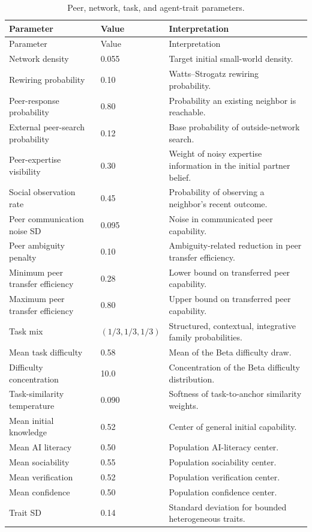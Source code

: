 \documentclass[11pt]{article}
\begin{document}
\begin{longtable}{p{}p{}p{}}
\caption{Peer, network, task, and agent-trait parameters.}\label{tab:param_peer}\\
\toprule Parameter & Value & Interpretation \\
\midrule\endfirsthead\toprule Parameter & Value & Interpretation \\
\midrule\endhead
Network density & 0.055 & Target initial small-world density. \\
Rewiring probability & 0.10 & Watts--Strogatz rewiring probability. \\
Peer-response probability & 0.80 & Probability an existing neighbor is reachable. \\
External peer-search probability & 0.12 & Base probability of outside-network search. \\
Peer-expertise visibility & 0.30 & Weight of noisy expertise information in the initial partner belief. \\
Social observation rate & 0.45 & Probability of observing a neighbor's recent outcome. \\
Peer communication noise SD & 0.095 & Noise in communicated peer capability. \\
Peer ambiguity penalty & 0.10 & Ambiguity-related reduction in peer transfer efficiency. \\
Minimum peer transfer efficiency & 0.28 & Lower bound on transferred peer capability. \\
Maximum peer transfer efficiency & 0.80 & Upper bound on transferred peer capability. \\
Task mix & $(1/3,1/3,1/3)$ & Structured, contextual, integrative family probabilities. \\
Mean task difficulty & 0.58 & Mean of the Beta difficulty draw. \\
Difficulty concentration & 10.0 & Concentration of the Beta difficulty distribution. \\
Task-similarity temperature & 0.090 & Softness of task-to-anchor similarity weights. \\
Mean initial knowledge & 0.52 & Center of general initial capability. \\
Mean AI literacy & 0.50 & Population AI-literacy center. \\
Mean sociability & 0.55 & Population sociability center. \\
Mean verification & 0.52 & Population verification center. \\
Mean confidence & 0.50 & Population confidence center. \\
Trait SD & 0.14 & Standard deviation for bounded heterogeneous traits. \\
\bottomrule
\end{longtable}
\end{document}
